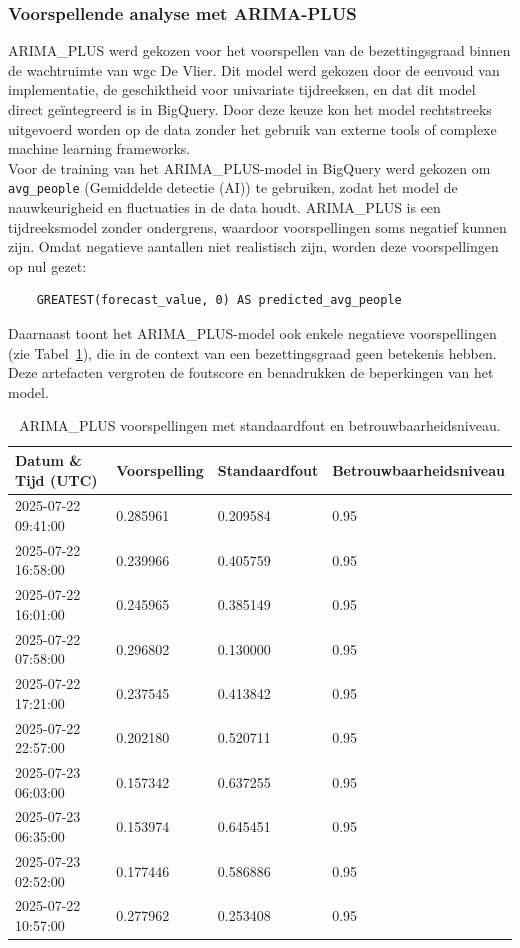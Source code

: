 \subsubsection{Voorspellende analyse met ARIMA-PLUS}
ARIMA\_PLUS werd gekozen voor het voorspellen van de bezettingsgraad binnen de wachtruimte van \gls{wgc} De Vlier. Dit model werd gekozen door de eenvoud van implementatie, de geschiktheid voor univariate tijdreeksen, en dat dit model direct geïntegreerd is in BigQuery. Door deze keuze kon het model rechtstreeks uitgevoerd worden op de data zonder het gebruik van externe tools of complexe machine learning frameworks.  \\

Voor de training van het ARIMA\_PLUS-model in BigQuery werd gekozen om \texttt{avg\_people} (Gemiddelde detectie (AI)) te gebruiken, zodat het model de nauwkeurigheid en fluctuaties in de data houdt. ARIMA\_PLUS is een tijdreeksmodel zonder ondergrens, waardoor voorspellingen soms negatief kunnen zijn. Omdat negatieve aantallen niet realistisch zijn, worden deze voorspellingen op nul gezet: 

\begin{verbatim}
    GREATEST(forecast_value, 0) AS predicted_avg_people
\end{verbatim}

Daarnaast toont het ARIMA\_PLUS-model ook enkele negatieve voorspellingen (zie Tabel~\ref{tab:voorspellingen_a}), die in de context van een bezettingsgraad geen betekenis hebben. Deze artefacten vergroten de foutscore en benadrukken de beperkingen van het model.

\begin{table}[H]
    \small
    \begin{tabular}{|p{3.5cm}|p{2.5cm}|p{3cm}|p{4.8cm}|}
        \hline
        \textbf{Datum \& Tijd (UTC)} & \textbf{Voorspelling} & \textbf{Standaardfout} & \textbf{Betrouwbaarheidsniveau} \\
        \hline
        2025-07-22 09:41:00 & 0.285961 & 0.209584 & 0.95 \\
        2025-07-22 16:58:00 & 0.239966 & 0.405759 & 0.95 \\
        2025-07-22 16:01:00 & 0.245965 & 0.385149 & 0.95 \\
        2025-07-22 07:58:00 & 0.296802 & 0.130000 & 0.95 \\
        2025-07-22 17:21:00 & 0.237545 & 0.413842 & 0.95 \\
        2025-07-22 22:57:00 & 0.202180 & 0.520711 & 0.95 \\
        2025-07-23 06:03:00 & 0.157342 & 0.637255 & 0.95 \\
        2025-07-23 06:35:00 & 0.153974 & 0.645451 & 0.95 \\
        2025-07-23 02:52:00 & 0.177446 & 0.586886 & 0.95 \\
        2025-07-22 10:57:00 & 0.277962 & 0.253408 & 0.95 \\
        \hline
    \end{tabular}
    \caption{ARIMA\_PLUS voorspellingen met standaardfout en betrouwbaarheidsniveau.}
    \label{tab:voorspellingen_a}
\end{table}

